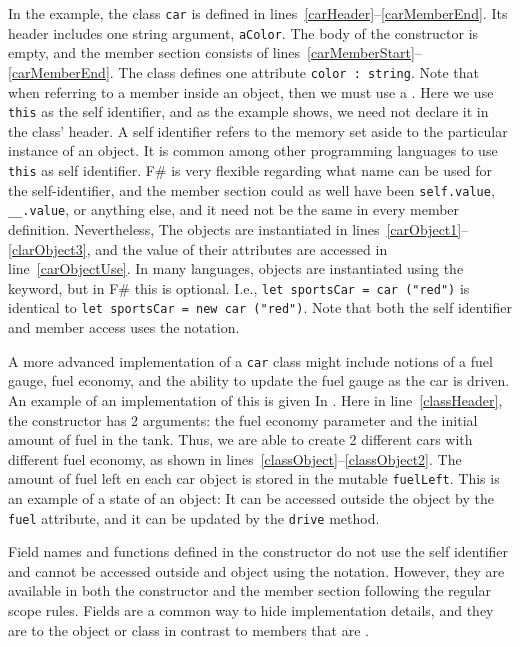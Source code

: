 In the example, the class \lstinline{car} is defined in lines~\ref{carHeader}--\ref{carMemberEnd}. Its header includes one string argument, \lstinline{aColor}. The body of the constructor is empty, and the member section consists of lines~\ref{carMemberStart}--\ref{carMemberEnd}. The class defines one attribute \lstinline{color : string}. Note that when referring to a member inside an object, then we must use a . Here we use \lstinline{this} as the self identifier, and as the example shows, we need not declare it in the class' header. A self identifier refers to the memory set aside to the particular instance of an object. It is common among other programming languages to use \lstinline{this} as self identifier. F\# is very flexible regarding what name can be used for the self-identifier, and the member section could as well have been \lstinline{self.value}, \lstinline{__.value}, or anything else, and it need not be the same in every member definition. Nevertheless,  The objects are instantiated in lines~\ref{carObject1}--\ref{clarObject3}, and the value of their attributes are accessed in line~\ref{carObjectUse}. In many languages, objects are instantiated using the  keyword, but in F\# this is optional. I.e., \lstinline{let sportsCar = car ("red")} is identical to \lstinline{let sportsCar = new car ("red")}. Note that both the self identifier and member access uses the  notation.

A more advanced implementation of a \lstinline{car} class might include notions of a fuel gauge, fuel economy, and the ability to update the fuel gauge as the car is driven. An example of an implementation of this is given In .
%
%
%
Here in line~\ref{classHeader}, the constructor has 2 arguments: the fuel economy parameter and the initial amount of fuel in the tank. Thus, we are able to create 2 different cars with different fuel economy, as shown in lines~\ref{classObject}--\ref{classObject2}. The amount of fuel left en each car object is stored in the mutable  \lstinline{fuelLeft}. This is an example of a state of an object: It can be accessed outside the object by the \lstinline{fuel} attribute, and it can be updated by the \lstinline{drive} method. 

Field names and functions defined in the constructor do not use the self identifier and cannot be accessed outside and object using the  notation. However, they are available in both the constructor and the member section following the regular scope rules. Fields are a common way to hide implementation details, and they are  to the object or class in contrast to members that are .

